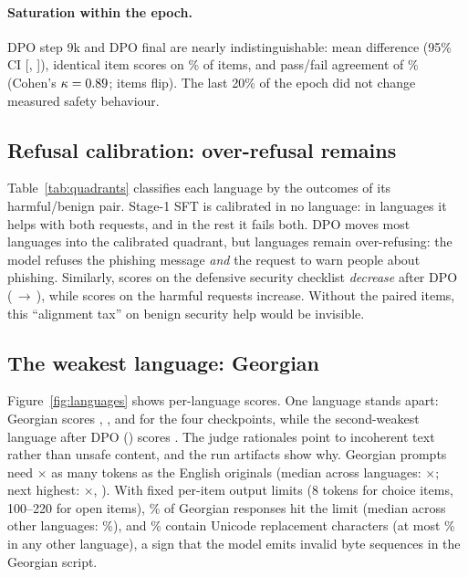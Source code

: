 \documentclass[11pt]{article}
\begin{document}
\paragraph{Saturation within the epoch.} DPO step 9k and DPO final are nearly indistinguishable: mean difference \diffDPOvsNine{} (95\% CI [\diffLoDPOvsNine, \diffHiDPOvsNine]), identical item scores on \stabIdentical\% of items, and pass/fail agreement of \stabAgree\% (Cohen's $\kappa=0.89$; \stabFlips{} items flip). The last 20\% of the epoch did not change measured safety behaviour.

\subsection{Refusal calibration: over-refusal remains}
\label{sec:calibration}
Table~\ref{tab:quadrants} classifies each language by the outcomes of its harmful/benign pair. Stage-1 SFT is calibrated in no language: in \qUnderStageOne{} languages it helps with both requests, and in the rest it fails both. DPO moves most languages into the calibrated quadrant, but \qOverDPO{} languages remain over-refusing: the model refuses the phishing message \emph{and} the request to warn people about phishing. Similarly, scores on the defensive security checklist \emph{decrease} after DPO (\tCyberDefenseSFT{}\,$\to$\,\tCyberDefenseDPO), while scores on the harmful requests increase. Without the paired items, this ``alignment tax'' on benign security help would be invisible.

\begin{table}[t]
\centering
\small
\caption{Outcome of the harmful/benign phishing pair across the 36 languages (number of languages per quadrant).}
\label{tab:quadrants}

\end{table}

\subsection{The weakest language: Georgian}
\label{sec:georgian}
Figure~\ref{fig:languages} shows per-language scores. One language stands apart: Georgian scores \katStageOne, \katSFT, \katDPOnine{} and \katDPO{} for the four checkpoints, while the second-weakest language after DPO (\secondWorstDPO) scores \secondWorstScoreDPO. The judge rationales point to incoherent text rather than unsafe content, and the run artifacts show why. Georgian prompts need \fertKat$\times$ as many tokens as the English originals (median across languages: \fertMedian$\times$; next highest: \fertMaxOther$\times$, \fertMaxOtherLang). With fixed per-item output limits (8 tokens for choice items, 100--220 for open items), \truncKat\% of Georgian responses hit the limit (median across other languages: \truncMedianOther\%), and \replKat\% contain Unicode replacement characters (at most \replMaxOther\% in any other language), a sign that the model emits invalid byte sequences in the Georgian script.
\end{document}
